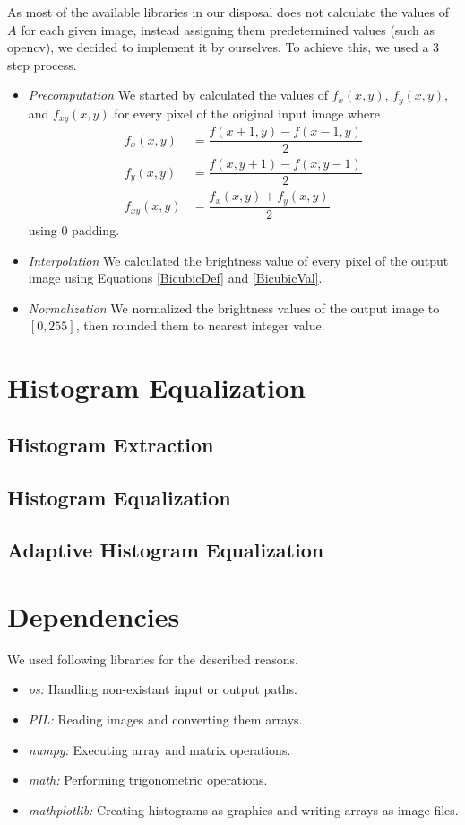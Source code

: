 \documentclass[conference]{IEEEtran}
\begin{document}
As most of the available libraries in our disposal does not calculate the values of $A$ for each given image, instead assigning them predetermined values (such as opencv), we decided to implement it by ourselves. To achieve this, we used a 3 step process.
\begin{itemize}
	\item \textit{Precomputation} We started by calculated the values of $f_x(x,y)$, $f_y(x,y)$, and $f_{xy}(x,y)$ for every pixel of the original input image where
	\begin{align}
		f_x(x,y) &= \dfrac{f(x+1,y)-f(x-1,y)}{2}\\
		f_y(x,y) &= \dfrac{f(x,y+1)-f(x,y-1)}{2}\\
		f_{xy}(x,y) &= \dfrac{f_x(x,y)+f_y(x,y)}{2}
	\end{align}
	using $0$ padding.
	\item \textit{Interpolation} We calculated the brightness value of every pixel of the output image using Equations \ref{BicubicDef} and \ref{BicubicVal}.
	\item \textit{Normalization} We normalized the brightness values of the output image to $[0,255]$, then rounded them to nearest integer value.
\end{itemize}

\section{Histogram Equalization}


\subsection{Histogram Extraction}


\subsection{Histogram Equalization}



\subsection{Adaptive Histogram Equalization}


\section{Dependencies}
We used following libraries for the described reasons.
\begin{itemize}
	\item \textit{os:} Handling non-existant input or output paths.
	\item \textit{PIL:} Reading images and converting them arrays.
	\item \textit{numpy:} Executing array and matrix operations.
	\item \textit{math:} Performing trigonometric operations.
	\item \textit{mathplotlib:} Creating histograms as graphics and writing arrays as image files.
\end{itemize}
\end{document}
